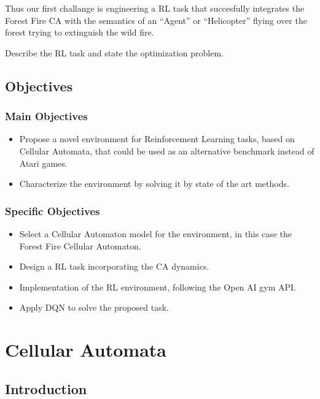 \documentclass[
  openany]{book}
\providecommand{\tightlist}{%
  \setlength{\itemsep}{0pt}\setlength{\parskip}{0pt}}
\begin{document}
Thus our first challange is engineering a RL task that succesfully integrates the Forest Fire CA with the semantics of an ``Agent'' or ``Helicopter'' flying over the forest trying to extinguish the wild fire.

Describe the RL task and state the optimization problem.

\hypertarget{objectives}{%
\section{Objectives}\label{objectives}}

\hypertarget{main-objectives}{%
\subsection{Main Objectives}\label{main-objectives}}

\begin{itemize}
\tightlist
\item
  Propose a novel environment for Reinforcement Learning tasks, based on Cellular Automata, that could be used as an alternative benchmark instead of Atari games.
\item
  Characterize the environment by solving it by state of the art methods.
\end{itemize}

\hypertarget{specific-objectives}{%
\subsection{Specific Objectives}\label{specific-objectives}}

\begin{itemize}
\tightlist
\item
  Select a Cellular Automaton model for the environment, in this case the Forest Fire Cellular Automaton.
\item
  Design a RL task incorporating the CA dynamics.
\item
  Implementation of the RL environment, following the Open AI gym API.
\item
  Apply DQN to solve the proposed task.
\end{itemize}

\hypertarget{cellular-automata}{%
\chapter{Cellular Automata}\label{cellular-automata}}

\hypertarget{introduction-1}{%
\section{Introduction}\label{introduction-1}}
\end{document}
